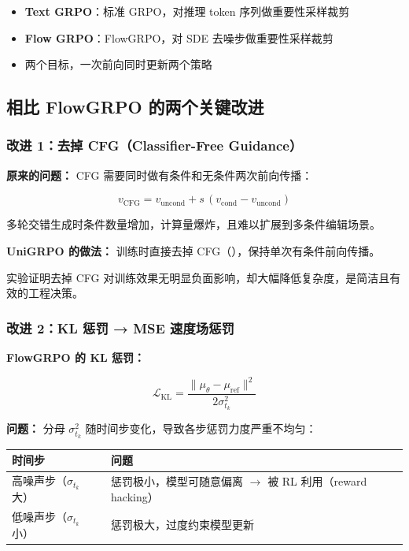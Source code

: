 \begin{itemize}[leftmargin=1.5em]
  \item \textbf{Text GRPO}：标准 GRPO，对推理 token 序列做重要性采样裁剪
  \item \textbf{Flow GRPO}：FlowGRPO，对 SDE 去噪步做重要性采样裁剪
  \item 两个目标，一次前向同时更新两个策略
\end{itemize}

\subsection{相比 FlowGRPO 的两个关键改进}

\subsubsection{改进 1：去掉 CFG（Classifier-Free Guidance）}

\textbf{原来的问题：} CFG 需要同时做有条件和无条件两次前向传播：

\[
v_\text{CFG} = v_\text{uncond} + s\,(v_\text{cond} - v_\text{uncond})
\]

多轮交错生成时条件数量增加，计算量爆炸，且难以扩展到多条件编辑场景。

\textbf{UniGRPO 的做法：} 训练时直接去掉 CFG（），保持单次有条件前向传播。

\begin{summarybox}
实验证明去掉 CFG 对训练效果无明显负面影响，却大幅降低复杂度，是简洁且有效的工程决策。
\end{summarybox}

\subsubsection{改进 2：KL 惩罚 → MSE 速度场惩罚}

\textbf{FlowGRPO 的 KL 惩罚：}

\[
\mathcal{L}_\text{KL} = \frac{\|\mu_\theta - \mu_\text{ref}\|^2}{2\sigma_{t_k}^2}
\]

\textbf{问题：} 分母 $\sigma_{t_k}^2$ 随时间步变化，导致各步惩罚力度严重不均匀：

\begin{center}
{\small
\begin{tabular}{p{5cm}p{7.5cm}}
\hline
\textbf{时间步} & \textbf{问题} \\
\hline
高噪声步（$\sigma_{t_k}$ 大） & 惩罚极小，模型可随意偏离 $\to$ 被 RL 利用（reward hacking） \\
低噪声步（$\sigma_{t_k}$ 小） & 惩罚极大，过度约束模型更新 \\
\hline
\end{tabular}
}
\end{center}

